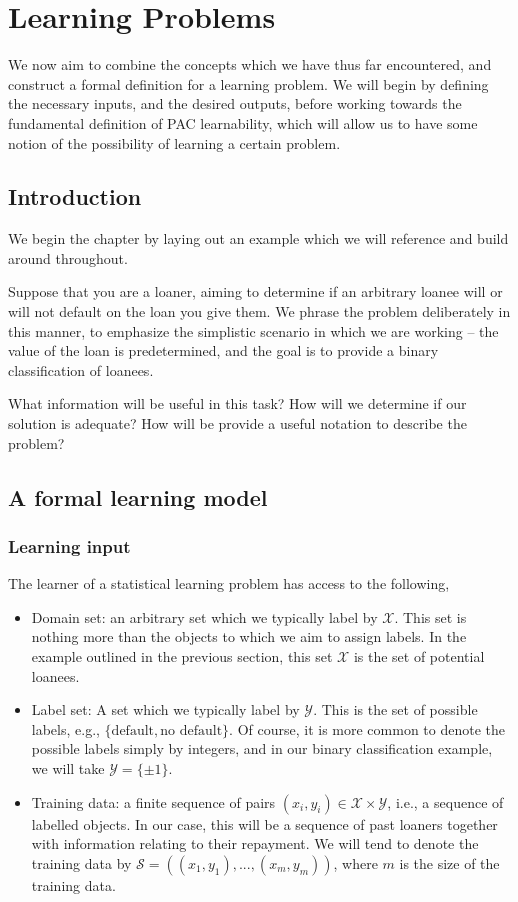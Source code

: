 \chapter{Learning Problems}

\begin{chout}
	We now aim to combine the concepts which we have thus far encountered, and construct a formal definition for a learning problem. We will begin by defining the necessary inputs, and the desired outputs, before working towards the fundamental definition of PAC learnability, which will allow us to have some notion of the possibility of learning a certain problem.
\end{chout}

\section{Introduction}
We begin the chapter by laying out an example which we will reference and build around throughout.

Suppose that you are a loaner, aiming to determine if an arbitrary loanee will or will not default on the loan you give them. We phrase the problem deliberately in this manner, to emphasize the simplistic scenario in which we are working -- the value of the loan is predetermined, and the goal is to provide a binary classification of loanees.

What information will be useful in this task? How will we determine if our solution is adequate? How will be provide a useful notation to describe the problem?

\section{A formal learning model \basic}
\subsection{Learning input}
The learner of a statistical learning problem has access to the following,
\begin{itemize}
	\item Domain set: an arbitrary set which we typically label by $ \mathcal{X} $. This set is nothing more than the objects to which we aim to assign labels. In the example outlined in the previous section, this set $ \mathcal{X} $ is the set of potential loanees.
	\item Label set: A set which we typically label by $ \mathcal{Y} $. This is the set of possible labels, e.g., $ \{ \text{default} , \text{no default} \} $. Of course, it is more common to denote the possible labels simply by integers, and in our binary classification example, we will take $ \mathcal{Y}=\{ \pm1 \} $.
	\item Training data: a finite sequence of pairs $ ( x_{i}, y_{i} )\in \mathcal{X}\times \mathcal{Y} $, i.e., a sequence of labelled objects. In our case, this will be a sequence of past loaners together with information relating to their repayment. We will tend to denote the training data by $ \mathcal{S} = ( ( x_{1}, y_{1} ), ..., ( x_{m}, y_{m} ) ) $, where $ m $ is the size of the training data.
\end{itemize}

